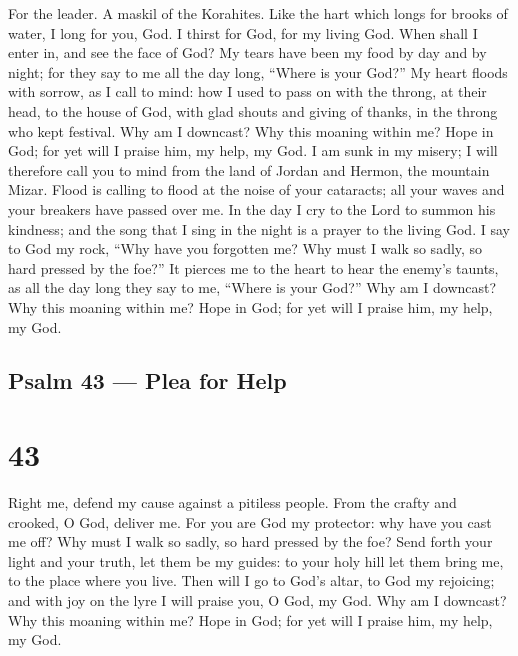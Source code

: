 For the leader. A maskil of the Korahites.  Like the hart
which longs for brooks of water, I long for you, God.  I
thirst for God, for my living God. When shall I enter in, and see the
face of God?  My tears have been my food by day and by
night; for they say to me all the day long, ``Where is your God?''
 My heart floods with sorrow, as I call to mind: how I used
to pass on with the throng, at their head, to the house of God, with
glad shouts and giving of thanks, in the throng who kept festival.
 Why am I downcast? Why this moaning within me? Hope in God;
for yet will I praise him, my help, my God.  I am sunk in my
misery; I will therefore call you to mind from the land of Jordan and
Hermon, the mountain Mizar.  Flood is calling to flood at
the noise of your cataracts; all your waves and your breakers have
passed over me.  In the day I cry to the Lord to summon his
kindness; and the song that I sing in the night is a prayer to the
living God.  I say to God my rock, ``Why have you forgotten
me? Why must I walk so sadly, so hard pressed by the foe?''
 It pierces me to the heart to hear the enemy's taunts, as
all the day long they say to me, ``Where is your God?'' 
Why am I downcast? Why this moaning within me? Hope in God; for yet will
I praise him, my help, my God.

\hypertarget{psalm-43-plea-for-help}{%
\subsection{Psalm 43 --- Plea for Help}\label{psalm-43-plea-for-help}}

\hypertarget{section-42}{%
\section{43}\label{section-42}}

 Right me, defend my cause against a pitiless people. From
the crafty and crooked, O God, deliver me.  For you are God
my protector: why have you cast me off? Why must I walk so sadly, so
hard pressed by the foe?  Send forth your light and your
truth, let them be my guides: to your holy hill let them bring me, to
the place where you live.  Then will I go to God's altar, to
God my rejoicing; and with joy on the lyre I will praise you, O God, my
God.  Why am I downcast? Why this moaning within me? Hope in
God; for yet will I praise him, my help, my God.

